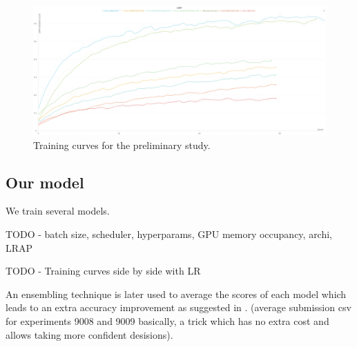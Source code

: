 \begin{figure}[ht]
    \centering
    \includegraphics[width=1.\textwidth]{figures/preliminary_study.png}
    \caption{Training curves for the preliminary study.}
    \label{fig:preliminary_study_curves}
\end{figure}



\subsection*{Our model}
\label{sec:our model}
We train several models.

\color{red}TODO - batch size, scheduler, hyperparams, GPU memory occupancy, archi, LRAP \color{black}

\color{red}TODO - Training curves side by side with LR \color{black}

An ensembling technique is later used to average the scores of each model which leads to an extra accuracy improvement as suggested in \cite{text2mol}. (average submission csv for experiments 9008 and 9009 basically, a trick which has no extra cost and allows taking more confident desisions).